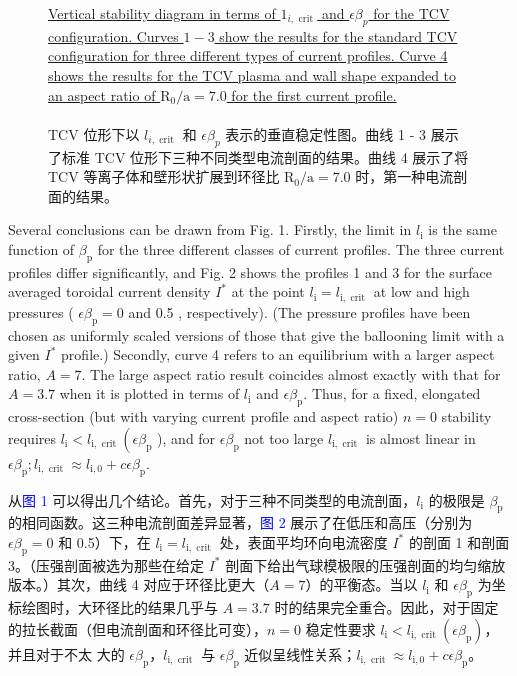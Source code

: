 \documentclass[utf8]{ctexart}
\newcommand\enzhbox[2]{
  	\quad\par \begin{paracol}{2} \colseprulecolor{black} 
  		\begin{spacing}{1.0}
  			\footnotesize  #1
  		\end{spacing}
  		\switchcolumn[1] 
  		#2
  	\end{paracol} \quad\par
  }
\begin{document}
\begin{sloppypar}
\begin{figure}[H]
 \caption{\uline{Vertical stability diagram in terms of $1_{i, \text { crit }}$ and $\epsilon \beta_{p}$ for the TCV configuration. Curves $1-3$ show the results for the standard TCV configuration for three different types of current profiles. Curve 4 shows the results for the TCV plasma and wall shape expanded to an aspect ratio of $\mathrm{R}_{0} / \mathrm{a}=7.0$ for the first current profile.\\}\\TCV 位形下以 $l_{i, \text { crit }}$ 和 $\epsilon \beta_{p}$ 表示的垂直稳定性图。曲线 1 - 3 展示了标准 TCV 位形下三种不同类型电流剖面的结果。曲线 4 展示了将 TCV 等离子体和壁形状扩展到环径比 $\mathrm{R}_{0} / \mathrm{a}=7.0$ 时，第一种电流剖面的结果。}
  	\label{fig1.}
  \end{figure}
  
  
 
\enzhbox{  Several conclusions can be drawn from Fig. 1. Firstly, the limit in $l_{\mathrm{i}}$ is the same function of $\beta_{\mathrm{p}}$ for the three different classes of current profiles. The three current profiles differ significantly, and Fig. 2 shows the profiles 1 and 3 for the surface averaged toroidal current density $I^{*}$ at the point $l_{\mathrm{i}}=l_{\mathrm{i}, \text { crit }}$ at low and high pressures ( $\epsilon \beta_{\mathrm{p}}=0$ and 0.5 , respectively). (The pressure profiles have been chosen as uniformly scaled versions of those that give the ballooning limit with a given $I^{*}$ profile.) Secondly, curve 4 refers to an equilibrium with a larger aspect ratio, $A=7$. The large aspect ratio result coincides almost exactly with that for $A=3.7$ when it is plotted in terms of $l_{\mathrm{i}}$ and $\epsilon \beta_{\mathrm{p}}$. Thus, for a fixed, elongated cross-section (but with varying current profile and aspect ratio) $n=0$ stability requires $l_{\mathrm{i}}<l_{\mathrm{i}, \text { crit }}\left(\epsilon \beta_{\mathrm{p}}\right.$ ), and for $\epsilon \beta_{\mathrm{p}}$ not too large $l_{\mathrm{i}, \text { crit }}$ is almost linear in $\epsilon \beta_{\mathrm{p}} ; l_{\mathrm{i}, \text { crit }} \approx l_{\mathrm{i}, 0}+c \epsilon \beta_{\mathrm{p}}$.}{
从\textcolor{blue}{图 1} 可以得出几个结论。首先，对于三种不同类型的电流剖面，$l_{\mathrm{i}}$ 的极限是 $\beta_{\mathrm{p}}$ 的相同函数。这三种电流剖面差异显著，\textcolor{blue}{图 2} 展示了在低压和高压（分别为 $\epsilon \beta_{\mathrm{p}} = 0$ 和 0.5）下，在 $l_{\mathrm{i}} = l_{\mathrm{i}, \text { crit }}$ 处，表面平均环向电流密度 $I^{*}$ 的剖面 1 和剖面 3。（压强剖面被选为那些在给定 $I^{*}$ 剖面下给出气球模极限的压强剖面的均匀缩放版本。）其次，曲线 4 对应于环径比更大（$A = 7$）的平衡态。当以 $l_{\mathrm{i}}$ 和 $\epsilon \beta_{\mathrm{p}}$ 为坐标绘图时，大环径比的结果几乎与 $A = 3.7$ 时的结果完全重合。因此，对于固定的拉长截面（但电流剖面和环径比可变），$n = 0$ 稳定性要求 $l_{\mathrm{i}} < l_{\mathrm{i}, \text { crit }}(\epsilon \beta_{\mathrm{p}})$，并且对于不太 大的 $\epsilon \beta_{\mathrm{p}}$，$l_{\mathrm{i}, \text { crit }}$ 与 $\epsilon \beta_{\mathrm{p}}$ 近似呈线性关系；$l_{\mathrm{i}, \text { crit }} \approx l_{\mathrm{i}, 0} + c \epsilon \beta_{\mathrm{p}}$。 }
  

\end{sloppypar}
\end{document}
